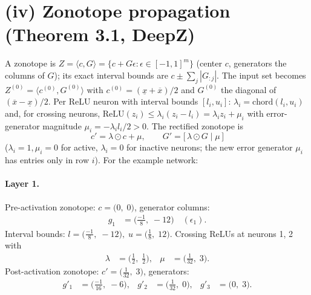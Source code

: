 \documentclass[11pt]{article}
\begin{document}
\section{(iv) Zonotope propagation (Theorem 3.1, DeepZ)}
A zonotope is $Z = \langle c, G \rangle = \{c + G\epsilon : \epsilon \in [-1,1]^m\}$
(center $c$, generators the columns of $G$); its exact interval bounds are
$c \pm \sum_j |G_{:j}|$. The input set becomes $Z^{(0)} = \langle c^{(0)}, G^{(0)} \rangle$ with
$c^{(0)} = (\underline{x} + \overline{x})/2$ and $G^{(0)}$ the diagonal of $(\overline{x} - \underline{x})/2$.
Per ReLU neuron with interval bounds $[l_i, u_i]$:
$\lambda_i = \mathrm{chord}(l_i, u_i)$ and, for crossing neurons,
$\mathrm{ReLU}(z_i) \le \lambda_i (z_i - l_i) = \lambda_i z_i + \mu_i$ with error-generator magnitude
$\mu_i = -\lambda_i l_i / 2 > 0$. The rectified zonotope is
\begin{equation*}
c' = \lambda \odot c + \mu, \qquad G' = \bigl[\, \lambda \odot G \;\big|\; \mu\, \bigr]
\end{equation*}
($\lambda_i = 1, \mu_i = 0$ for active, $\lambda_i = 0$ for inactive neurons;
the new error generator $\mu_i$ has entries only in row $i$).
For the example network:
\paragraph{Layer 1.}
Pre-activation zonotope: $c = \bigl(0,\; 0\bigr)$, generator columns:
\begin{align*}
g_{1} &= \bigl(\frac{-1}{8},\; -12\bigr) \quad (\epsilon_{1}).
\end{align*}
Interval bounds: $l = \bigl(\frac{-1}{8},\; -12\bigr), \; u = \bigl(\frac{1}{8},\; 12\bigr)$. 
Crossing ReLUs at neurons 1, 2 with
\begin{align*}
\lambda &= \bigl(\frac{1}{2},\; \frac{1}{2}\bigr), & \mu &= \bigl(\frac{1}{32},\; 3\bigr).
\end{align*}
Post-activation zonotope: $c' = \bigl(\frac{1}{32},\; 3\bigr)$, generators:
\begin{align*}
g'_{1} &= \bigl(\frac{-1}{16},\; -6\bigr), &
g'_{2} &= \bigl(\frac{1}{32},\; 0\bigr), &
g'_{3} &= \bigl(0,\; 3\bigr).
\end{align*}
\end{document}
